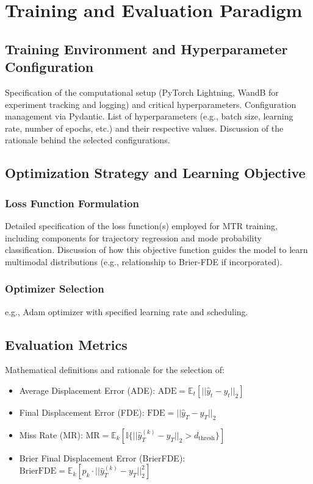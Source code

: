 

\chapter{Training and Evaluation Paradigm}
\label{ch:experimental_design}

\section{Training Environment and Hyperparameter Configuration}
\label{sec:exp_training_env}
Specification of the computational setup (PyTorch Lightning, WandB for experiment tracking and logging) and critical hyperparameters. Configuration management via Pydantic. List of hyperparameters (e.g., batch size, learning rate, number of epochs, etc.) and their respective values. Discussion of the rationale behind the selected configurations.

\section{Optimization Strategy and Learning Objective}
\label{sec:exp_optimization}
    \subsection{Loss Function Formulation}
    Detailed specification of the loss function(s) employed for MTR training, including components for trajectory regression and mode probability classification. Discussion of how this objective function guides the model to learn multimodal distributions (e.g., relationship to Brier-FDE if incorporated).
    \subsection{Optimizer Selection}
    e.g., Adam optimizer with specified learning rate and scheduling.

\section{Evaluation Metrics}
\label{sec:exp_metrics}
Mathematical definitions and rationale for the selection of:
\begin{itemize}
    \item Average Displacement Error (ADE): $\text{ADE}=\mathbb{E}_{t}[||\hat{y}_{t}-y_{t}||_{2}]$
    \item Final Displacement Error (FDE): $\text{FDE}=||\hat{y}_{T}-y_{T}||_{2}$
    \item Miss Rate (MR): $\text{MR}=\mathbb{E}_{k}[\mathbb{I}\{||\hat{y}_{T}^{(k)}-y_{T}||_{2}>d_{\text{thresh}}\}]$
    \item Brier Final Displacement Error (BrierFDE): $\text{BrierFDE}=\mathbb{E}_{k}[p_{k}\cdot||\hat{y}_{T}^{(k)}-y_{T}||_{2}^{2}]$
\end{itemize}